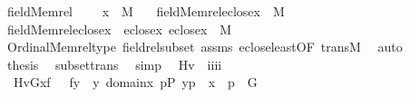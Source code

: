 \begin{isabellebody}
\ field{\isacharunderscore}{\kern0pt}Memrel{}\ {\isacharcolon}{\kern0pt}\isanewline
\ \ \ {\isachardoublequoteopen}x\ {\isasymin}\ M{\isachardoublequoteclose}\isanewline
\ \ \ {\isachardoublequoteopen}field{\isacharparenleft}{\kern0pt}Memrel{\isacharparenleft}{\kern0pt}eclose{\isacharparenleft}{\kern0pt}{\isacharbraceleft}{\kern0pt}x{\isacharbraceright}{\kern0pt}{\isacharparenright}{\kern0pt}{\isacharparenright}{\kern0pt}{\isacharparenright}{\kern0pt}\ {\isasymsubseteq}\ M{\isachardoublequoteclose}\isanewline
%
\isadelimproof
%
\endisadelimproof
%
\isatagproof
{}\isamarkupfalse%
\ {\isacharminus}{\kern0pt}\isanewline
\ \ \isamarkupfalse%
\ {\isachardoublequoteopen}field{\isacharparenleft}{\kern0pt}Memrel{\isacharparenleft}{\kern0pt}eclose{\isacharparenleft}{\kern0pt}{\isacharbraceleft}{\kern0pt}x{\isacharbraceright}{\kern0pt}{\isacharparenright}{\kern0pt}{\isacharparenright}{\kern0pt}{\isacharparenright}{\kern0pt}\ {\isasymsubseteq}\ eclose{\isacharparenleft}{\kern0pt}{\isacharbraceleft}{\kern0pt}x{\isacharbraceright}{\kern0pt}{\isacharparenright}{\kern0pt}{\isachardoublequoteclose}\ {\isachardoublequoteopen}eclose{\isacharparenleft}{\kern0pt}{\isacharbraceleft}{\kern0pt}x{\isacharbraceright}{\kern0pt}{\isacharparenright}{\kern0pt}\ {\isasymsubseteq}\ M{\isachardoublequoteclose}\isanewline
\ \ \ \ \isamarkupfalse%
\ Ordinal{\isachardot}{\kern0pt}Memrel{\isacharunderscore}{\kern0pt}type\ field{\isacharunderscore}{\kern0pt}rel{\isacharunderscore}{\kern0pt}subset\ assms\ eclose{\isacharunderscore}{\kern0pt}least{\isacharbrackleft}{\kern0pt}OF\ trans{\isacharunderscore}{\kern0pt}M{\isacharbrackright}{\kern0pt}\ \isamarkupfalse%
\ auto\isanewline
\ \ \isamarkupfalse%
\isanewline
\ \ \isamarkupfalse%
\ {\isacharquery}{\kern0pt}thesis\ \isamarkupfalse%
\ subset{\isacharunderscore}{\kern0pt}trans\ \isamarkupfalse%
\ simp\isanewline
{}\isamarkupfalse%
%
\endisatagproof
{\isafoldproof}%
%
\isadelimproof
\isanewline
%
\endisadelimproof
\isanewline
{}\isamarkupfalse%
\isanewline
\ \ Hv\ {\isacharcolon}{\kern0pt}{\isacharcolon}{\kern0pt}\ {\isachardoublequoteopen}i{\isasymRightarrow}i{\isasymRightarrow}i{\isasymRightarrow}i{\isachardoublequoteclose}\ \isanewline
\ \ {\isachardoublequoteopen}Hv{\isacharparenleft}{\kern0pt}G{\isacharcomma}{\kern0pt}x{\isacharcomma}{\kern0pt}f{\isacharparenright}{\kern0pt}\ {\isasymequiv}\ {\isacharbraceleft}{\kern0pt}\ f{\isacharbackquote}{\kern0pt}y\ {\isachardot}{\kern0pt}{\isachardot}{\kern0pt}\ y{\isasymin}\ domain{\isacharparenleft}{\kern0pt}x{\isacharparenright}{\kern0pt}{\isacharcomma}{\kern0pt}\ {\isasymexists}p{\isasymin}P{\isachardot}{\kern0pt}\ {\isasymlangle}y{\isacharcomma}{\kern0pt}p{\isasymrangle}\ {\isasymin}\ x\ {\isasymand}\ p\ {\isasymin}\ G\ {\isacharbraceright}{\kern0pt}{\isachardoublequoteclose}%

\end{isabellebody}
